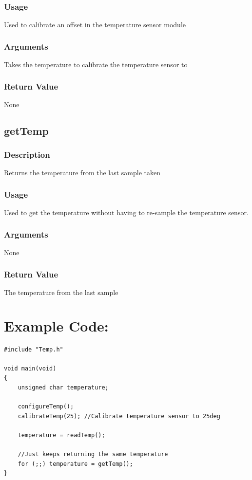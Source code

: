 \documentclass[]{report}
\begin{document}
\subsubsection{Usage}
Used to calibrate an offset in the temperature sensor module

\subsubsection{Arguments}
Takes the temperature to calibrate the temperature sensor to

\subsubsection{Return Value}
None

\subsection{getTemp}
\subsubsection{Description}
Returns the temperature from the last sample taken

\subsubsection{Usage}
Used to get the temperature without having to re-sample the temperature sensor.

\subsubsection{Arguments}
None

\subsubsection{Return Value}
The temperature from the last sample

\section{Example Code:}
\begin{lstlisting}
#include "Temp.h"

void main(void)
{
	unsigned char temperature;
	
	configureTemp();
	calibrateTemp(25); //Calibrate temperature sensor to 25deg
	
	temperature = readTemp();
	
	//Just keeps returning the same temperature
	for (;;) temperature = getTemp();
}
\end{lstlisting}
\end{document}
